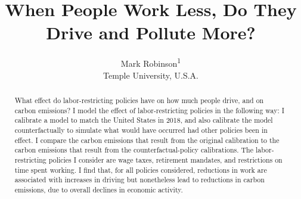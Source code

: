 \documentclass[letter, 12pt, epsf,leqno]{article}
\begin{document}
\title{When People Work Less, Do They Drive and Pollute More?
}

\author{
	Mark Robinson\textsuperscript{1}\\ 
        Temple University, U.S.A.}
\maketitle

\begin{abstract}
\noindent
What effect do labor-restricting policies have on how much people drive, and on carbon emissions?  I model the effect of labor-restricting policies in the following way: I calibrate a model to match the United States in 2018, and also calibrate the model counterfactually to simulate what would have occurred had other policies been in effect.  I compare the carbon emissions that result from the original calibration to the carbon emissions that result from the counterfactual-policy calibrations.  The labor-restricting policies I consider are wage taxes, retirement mandates, and restrictions on time spent working.  I find that, for all policies considered, reductions in work are associated with increases in driving but nonetheless lead to reductions in carbon emissions, due to overall declines in economic activity.  







\end{abstract}
\end{document}
